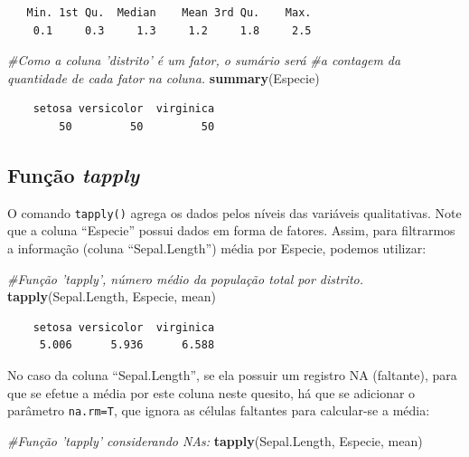 \documentclass[12pt,brazil,oneside]{book}
\newenvironment{Shaded}{\begin{snugshade}}{\end{snugshade}}
\newcommand{\CommentTok}[1]{\textcolor[rgb]{0.56,0.35,0.01}{\textit{#1}}}
\newcommand{\KeywordTok}[1]{\textcolor[rgb]{0.13,0.29,0.53}{\textbf{#1}}}
\newcommand{\NormalTok}[1]{#1}
\begin{document}
\begin{verbatim}
   Min. 1st Qu.  Median    Mean 3rd Qu.    Max. 
    0.1     0.3     1.3     1.2     1.8     2.5 
\end{verbatim}

\begin{Shaded}
\begin{Highlighting}[]
\CommentTok{#Como a coluna 'distrito' é um fator, o sumário será }
\CommentTok{#a contagem da quantidade de cada fator na coluna.}
\KeywordTok{summary}\NormalTok{(Especie)}
\end{Highlighting}
\end{Shaded}

\begin{verbatim}
    setosa versicolor  virginica 
        50         50         50 
\end{verbatim}

\hypertarget{funcao-tapply}{%
\subsection{\texorpdfstring{Função \emph{tapply}}{Função tapply}}\label{funcao-tapply}}

O comando \texttt{tapply()} agrega os dados pelos níveis das variáveis qualitativas. Note que a coluna ``Especie'' possui dados em forma de fatores. Assim, para filtrarmos a informação (coluna ``Sepal.Length'') média por Especie, podemos utilizar:

\begin{Shaded}
\begin{Highlighting}[]
\CommentTok{#Função 'tapply', número médio da população total por distrito.}
\KeywordTok{tapply}\NormalTok{(Sepal.Length, Especie, mean)}
\end{Highlighting}
\end{Shaded}

\begin{verbatim}
    setosa versicolor  virginica 
     5.006      5.936      6.588 
\end{verbatim}

No caso da coluna ``Sepal.Length'', se ela possuir um registro NA (faltante), para que se efetue a média por este coluna neste quesito, há que se adicionar o parâmetro \texttt{na.rm=T}, que ignora as células faltantes para calcular-se a média:

\begin{Shaded}
\begin{Highlighting}[]
\CommentTok{#Função 'tapply' considerando NAs:}
\KeywordTok{tapply}\NormalTok{(Sepal.Length, Especie, mean)}
\end{Highlighting}
\end{Shaded}
\end{document}
